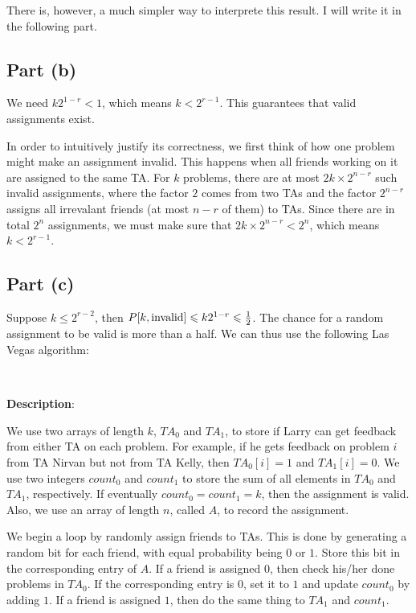 \documentclass{article}
\begin{document}
There is, however, a much simpler way to interprete this result. I will write it in the following part.

\subsection{Part (b)}
We need $k2^{1-r}<1$, which means $k<2^{r-1}$. This guarantees that valid assignments exist. 

In order to intuitively justify its correctness, we first think of how one problem might make an assignment invalid. This happens when all friends working on it are assigned to the same TA. For $k$ problems, there are at most $2k\times 2^{n-r}$ such invalid assignments, where the factor $2$ comes from two TAs and the factor $2^{n-r}$ assigns all irrevalant friends (at most $n-r$ of them) to TAs. Since there are in total $2^n$ assignments, we must make sure that $2k\times 2^{n-r}<2^n$, which means $k<2^{r-1}$.


\subsection{Part (c)}
Suppose $k\leqslant 2^{r-2}$, then $P[k,\textup{invalid}]\leqslant k2^{1-r}\leqslant\frac{1}{2}$. The chance for a random assignment to be valid is more than a half. We can thus use the following Las Vegas algorithm:

~

\noindent\textbf{Description}:

We use two arrays of length $k$, $T\!A_0$ and $T\!A_1$, to store if Larry can get feedback from either TA on each problem. For example, if he gets feedback on problem $i$ from TA Nirvan but not from TA Kelly, then $T\!A_0[i]=1$ and $T\!A_1[i]=0$. We use two integers $count_0$ and $count_1$ to store the sum of all elements in $T\!A_0$ and $T\!A_1$, respectively. If eventually $count_0=count_1=k$, then the assignment is valid. Also, we use an array of length $n$, called $A$, to record the assignment.

We begin a loop by randomly assign friends to TAs. This is done by generating a random bit for each friend, with equal probability being $0$ or $1$. Store this bit in the corresponding entry of $A$. If a friend is assigned $0$, then check his/her done problems in $T\!A_0$. If the corresponding entry is $0$, set it to $1$ and update $count_0$ by adding $1$. If a friend is assigned $1$, then do the same thing to $T\!A_1$ and $count_1$.
\end{document}

